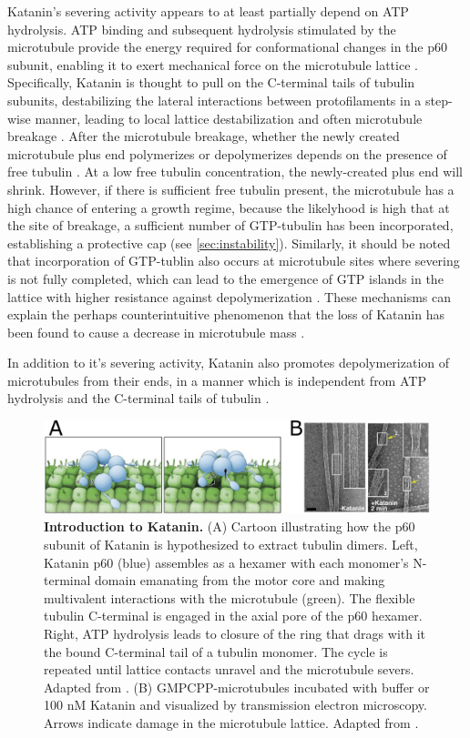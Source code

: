 Katanin's severing activity appears to at least partially depend on ATP hydrolysis. ATP binding and subsequent hydrolysis stimulated by the microtubule provide the energy required for conformational changes in the p60 subunit, enabling it to exert mechanical force on the microtubule lattice \parencite{Zehr2017}. Specifically, Katanin is thought to pull on the C-terminal tails of tubulin subunits, destabilizing the lateral interactions between protofilaments in a step-wise manner, leading to local lattice destabilization and often microtubule breakage . After the microtubule breakage, whether the newly created microtubule plus end polymerizes or depolymerizes depends on the presence of free tubulin \parencite{Vemu2018, Kuo2021}. At a low free tubulin concentration, the newly-created plus end will shrink. However, if there is sufficient free tubulin present, the microtubule has a high chance of entering a growth regime, because the likelyhood is high that at the site of breakage, a sufficient number of GTP-tubulin has been incorporated, establishing a protective cap (see \autoref{sec:instability}). Similarly, it should be noted that incorporation of GTP-tublin also occurs at microtubule sites where severing is not fully completed, which can lead to the emergence of GTP islands in the lattice with higher resistance against depolymerization \parencite{Vemu2018}. These mechanisms can explain the perhaps counterintuitive phenomenon that the loss of Katanin has been found to cause a decrease in microtubule mass \parencite{Vemu2018}. 
\par
In addition to it's severing activity, Katanin also promotes depolymerization of microtubules from their ends, in a manner which is independent from ATP hydrolysis and the C-terminal tails of tubulin \parencite{Belonogov2019}.

\begin{figure}[h!tb]
\centering
\includegraphics[width=\linewidth]{Figures/Katanin.png}
\caption[Introduction to Katanin.]{\textbf{Introduction to Katanin.}
(A) Cartoon illustrating how the p60 subunit of Katanin is hypothesized to extract tubulin dimers. Left, Katanin p60 (blue) assembles as a hexamer with each monomer's N-terminal domain emanating from the motor core and making multivalent interactions with the microtubule (green). The flexible tubulin C-terminal is engaged in the axial pore of the p60 hexamer. Right, ATP hydrolysis leads to closure of the ring that drags with it the bound C-terminal tail of a tubulin monomer. The cycle is repeated until lattice contacts unravel and the microtubule severs. Adapted from \cite{Zehr2017}. (B) GMPCPP-microtubules incubated with buffer or 100 nM Katanin and visualized by transmission electron microscopy. Arrows indicate damage in the microtubule lattice. Adapted from \cite{Grigorieff2018}.
	}\label{Katanin}
\end{figure}

